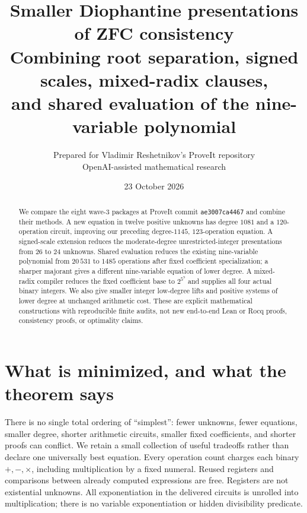 \documentclass[11pt]{article}
\title{Smaller Diophantine presentations of ZFC consistency\\
\large Combining root separation, signed scales, mixed-radix clauses,\\and shared evaluation of the nine-variable polynomial}
\author{Prepared for Vladimir Reshetnikov's ProveIt repository\\OpenAI-assisted mathematical research}
\date{23 October 2026}
\begin{document}
\maketitle
\begin{abstract}
We compare the eight wave-3 packages at ProveIt commit
\texttt{ae3007ca4467} and combine their methods. A new equation in twelve
positive unknowns has degree $1081$ and a $120$-operation circuit, improving
our preceding degree-$1145$, $123$-operation equation. A signed-scale
extension reduces the moderate-degree unrestricted-integer presentations
from $26$ to $24$ unknowns. Shared evaluation reduces the existing
nine-variable polynomial from $20\,531$ to $1485$ operations after fixed
coefficient specialization; a sharper majorant gives a different
nine-variable equation of lower degree. A mixed-radix compiler reduces the
fixed coefficient base to $2^{5^9}$ and supplies all four actual binary
integers. We also give smaller integer low-degree lifts and positive
systems of lower degree at unchanged arithmetic cost. These are explicit
mathematical constructions with reproducible finite audits, not new
end-to-end Lean or Rocq proofs, consistency proofs, or optimality claims.
\end{abstract}

\section{What is minimized, and what the theorem says}
There is no single total ordering of ``simplest'': fewer unknowns, fewer
equations, smaller degree, shorter arithmetic circuits, smaller fixed
coefficients, and shorter proofs can conflict. We retain a small collection
of useful tradeoffs rather than declare one universally best equation.
Every operation count charges each binary $+,-,\times$, including multiplication
by a fixed numeral. Reused registers and comparisons between already
computed expressions are free. Registers are not existential unknowns.
All exponentiation in the delivered circuits is unrolled into multiplication;
there is no variable exponentiation or hidden divisibility predicate.
\end{document}
